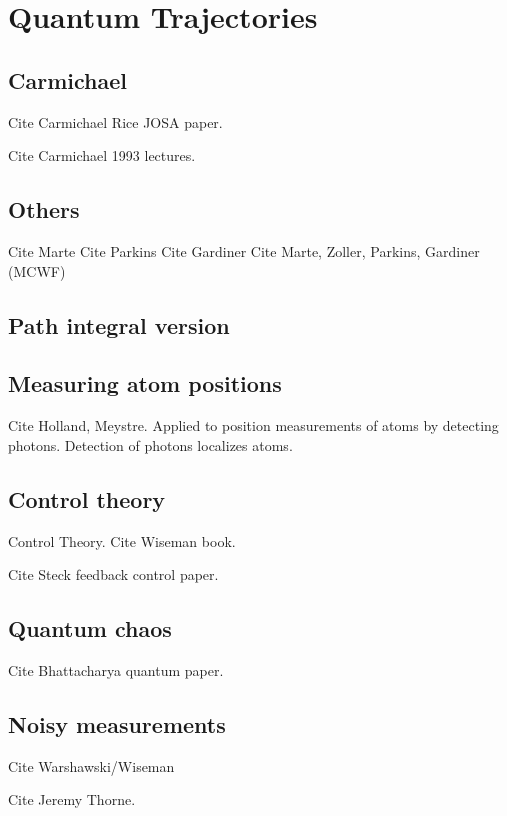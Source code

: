 \cite{Bechler1999}
\cite{Bechler2006}




\section{Quantum Trajectories}

\subsection{Carmichael}
Cite Carmichael Rice JOSA paper.

Cite Carmichael 1993 lectures. \cite{Carmichael1993}

\subsection{Others}

Cite Marte
Cite Parkins  
Cite Gardiner \cite{Gardiner1992}
Cite Marte, Zoller, Parkins, Gardiner (MCWF) \cite{Dalibard1992}
\cite{Dum1992}

\subsection{Path integral version}


\subsection{Measuring atom positions}

 Cite Holland, Meystre.  Applied to position measurements of atoms by detecting photons.  Detection of photons localizes atoms.  
\cite{Holland1996}


\subsection{Control theory}
 Control Theory.  Cite Wiseman book.   \cite{WisemanMilburn2010}
 
Cite Steck feedback control paper.  \cite{Steck2004, Steck2006}

\subsection{Quantum chaos}

Cite Bhattacharya quantum paper.  \cite{Bhattacharya2005}

\subsection{Noisy measurements}
Cite Warshawski/Wiseman \cite{Warszawski2003}

Cite Jeremy Thorne.  



